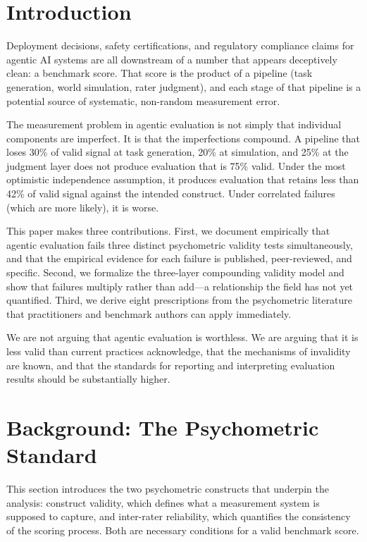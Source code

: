 \documentclass[preprint,12pt]{elsarticle}
\begin{document}
\section{Introduction}
\label{sec:intro}

Deployment decisions, safety certifications, and regulatory compliance claims for
agentic AI systems are all downstream of a number that appears deceptively clean: a
benchmark score. That score is the product of a pipeline (task generation, world
simulation, rater judgment), and each stage of that pipeline is a potential source of
systematic, non-random measurement error.

The measurement problem in agentic evaluation is not simply that individual
components are imperfect. It is that the imperfections compound. A pipeline that
loses 30\% of valid signal at task generation, 20\% at simulation, and 25\% at the
judgment layer does not produce evaluation that is 75\% valid. Under the most
optimistic independence assumption, it produces evaluation that retains less than
42\% of valid signal against the intended construct. Under correlated failures (which
are more likely), it is worse.

This paper makes three contributions. First, we document empirically that agentic
evaluation fails three distinct psychometric validity tests simultaneously, and that
the empirical evidence for each failure is published, peer-reviewed, and specific.
Second, we formalize the three-layer compounding validity model and show that failures
multiply rather than add---a relationship the field has not yet quantified. Third, we
derive eight prescriptions from the psychometric literature that practitioners and
benchmark authors can apply immediately.

We are not arguing that agentic evaluation is worthless. We are arguing that it is
less valid than current practices acknowledge, that the mechanisms of invalidity are
known, and that the standards for reporting and interpreting evaluation results should
be substantially higher.

\section{Background: The Psychometric Standard}
\label{sec:background}

This section introduces the two psychometric constructs that underpin the analysis:
construct validity, which defines what a measurement system is supposed to capture,
and inter-rater reliability, which quantifies the consistency of the scoring process.
Both are necessary conditions for a valid benchmark score.
\end{document}
